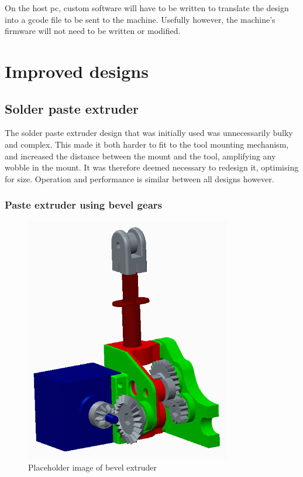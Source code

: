 \documentclass[a4paper,11pt]{article}  %
\begin{document}
On the host pc, custom software will have to be written to translate the design into a gcode file to be sent to the machine. Usefully however,
the machine's firmware will not need to be written or modified.

\section{Improved designs}

\subsection{Solder paste extruder}

The solder paste extruder design that was initially used was unnecessarily bulky and complex. This made it both harder to fit to the tool mounting mechanism, and increased the
distance between the mount and the tool, amplifying any wobble in the mount. It was therefore deemed necessary to redesign it, optimising for size. Operation and performance
is similar between all designs however.

\subsubsection{Paste extruder using bevel gears}
\begin{figure}[ht!]
\centering
\includegraphics[width=90mm]{resources/extruder_bevel.png}
\caption{Placeholder image of bevel extruder}
\label{overflow}
\end{figure}
\end{document}
